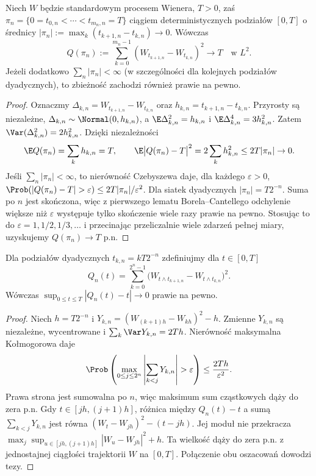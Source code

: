 \begin{twierdzenie}
Niech $W$ będzie standardowym procesem Wienera, $T>0$, zaś
$\pi_n=\{0=t_{0,n}<\cdots<t_{m_n,n}=T\}$
ciągiem deterministycznych podziałów $[0,T]$ o średnicy
$|\pi_n|:=\max_k(t_{k+1,n}-t_{k,n})\to0$.
Wówczas
\[
Q(\pi_n):=\sum_{k=0}^{m_n-1}
(W_{t_{k+1,n}}-W_{t_{k,n}})^2
\longrightarrow T\quad\text{w }L^2.
\]
Jeżeli dodatkowo $\sum_n|\pi_n|<\infty$ (w szczególności
dla kolejnych podziałów dyadycznych), to zbieżność
zachodzi również prawie na pewno.
\end{twierdzenie}
\begin{proof}
Oznaczmy $\Delta_{k,n}=W_{t_{k+1,n}}-W_{t_{k,n}}$
oraz $h_{k,n}=t_{k+1,n}-t_{k,n}$.
Przyrosty są niezależne, $\Delta_{k,n}\sim\Normal(0,h_{k,n})$,
a $\E\Delta_{k,n}^2=h_{k,n}$ i
$\E\Delta_{k,n}^4=3h_{k,n}^2$. Zatem
$\Var(\Delta_{k,n}^2)=2h_{k,n}^2$.
Dzięki niezależności
\[
\E Q(\pi_n)=\sum_k h_{k,n}=T,
\qquad
\E\bigl|Q(\pi_n)-T\bigr|^2
=2\sum_k h_{k,n}^2\le 2T|\pi_n|\to0.
\]
Jeśli $\sum_n|\pi_n|<\infty$, to nierówność
Czebyszewa daje, dla każdego $\varepsilon>0$,
$\Prob(|Q(\pi_n)-T|>\varepsilon)
\le 2T|\pi_n|/\varepsilon^2$.
Dla siatek dyadycznych $|\pi_n|=T2^{-n}$.
Suma po $n$ jest skończona, więc z pierwszego lematu
Borela--Cantellego odchylenie większe niż $\varepsilon$
występuje tylko skończenie wiele razy prawie na pewno.
Stosując to do $\varepsilon=1,1/2,1/3,\ldots$
i przecinając przeliczalnie wiele zdarzeń pełnej miary,
uzyskujemy $Q(\pi_n)\to T$ p.n.
\end{proof}

\begin{wniosek}
Dla podziałów dyadycznych $t_{k,n}=kT2^{-n}$
zdefiniujmy dla $t\in[0,T]$
\[
Q_n(t)=\sum_{k=0}^{2^n-1}
\bigl(W_{t\wedge t_{k+1,n}}-W_{t\wedge t_{k,n}}\bigr)^2.
\]
Wówczas $\sup_{0\le t\le T}|Q_n(t)-t|\to0$
prawie na pewno.
\end{wniosek}
\begin{proof}
Niech $h=T2^{-n}$ i
$Y_{k,n}=(W_{(k+1)h}-W_{kh})^2-h$.
Zmienne $Y_{k,n}$ są niezależne, wycentrowane i
$\sum_k\Var Y_{k,n}=2Th$.
Nierówność maksymalna Kołmogorowa daje
\[
\Prob\left(\max_{0\le j\le 2^n}
\left|\sum_{k<j}Y_{k,n}\right|>\varepsilon\right)
\le \frac{2Th}{\varepsilon^2}.
\]
Prawa strona jest sumowalna po $n$, więc maksimum
sum cząstkowych dąży do zera p.n. Gdy
$t\in[jh,(j+1)h]$, różnica między $Q_n(t)-t$
a sumą $\sum_{k<j}Y_{k,n}$ jest równa
$(W_t-W_{jh})^2-(t-jh)$. Jej moduł nie przekracza
$\max_j\sup_{u\in[jh,(j+1)h]}|W_u-W_{jh}|^2+h$.
Ta wielkość dąży do zera p.n. z jednostajnej
ciągłości trajektorii $W$ na $[0,T]$.
Połączenie obu oszacowań dowodzi tezy.
\end{proof}

